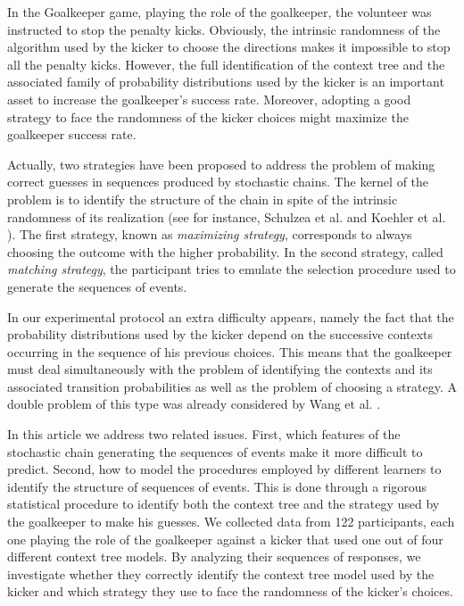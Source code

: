 \documentclass[fleqn,10pt]{wlscirep}
\begin{document}
In the Goalkeeper game, playing the role of the goalkeeper, the volunteer was instructed to stop the penalty kicks. Obviously, the intrinsic randomness of the algorithm used by the kicker to choose the directions makes it impossible to stop all the penalty kicks. However, the full identification of the context tree and the associated family of probability distributions used by the kicker is an important asset to increase the goalkeeper's success rate. Moreover, adopting a good strategy to face the randomness of the kicker choices might maximize the goalkeeper success rate.   

Actually, two strategies have been proposed to address the problem of making correct guesses in sequences produced by stochastic chains. The kernel of the problem is to identify the structure of the chain in spite of the intrinsic randomness of its realization (see for instance, Schulzea et al.\cite{Schulze2020} and Koehler et al. \cite{Koehler2010}). The first strategy, known as \textit{maximizing strategy}, corresponds to always choosing the outcome with the higher probability. In the second strategy, called \textit{matching strategy}, the participant tries to emulate the selection procedure used to generate the sequences of events.    

In our experimental protocol an extra difficulty appears, namely the fact that the probability distributions used by the kicker depend on the successive contexts occurring in the sequence of his previous choices. This means that the goalkeeper must deal simultaneously with the problem of identifying the contexts and its associated transition probabilities as well as the problem of choosing a strategy. A double problem of this type was already considered by Wang et al. \cite{wang_learning_2017}. 

In this article we address two related issues. First, which features of the stochastic chain generating the sequences of events make it more difficult to predict. Second, how to model the procedures employed by different learners to identify the structure of sequences of events. This is done through a rigorous statistical procedure to identify both the context tree and the strategy used by the goalkeeper to make his guesses. We collected data from 122 participants, each one playing the role of the goalkeeper against a kicker that used one out of four different context tree models. By analyzing their sequences of responses, we investigate whether they correctly identify the context tree model used by the kicker and which strategy they use to face the randomness of the kicker's choices.
	
\end{document}
